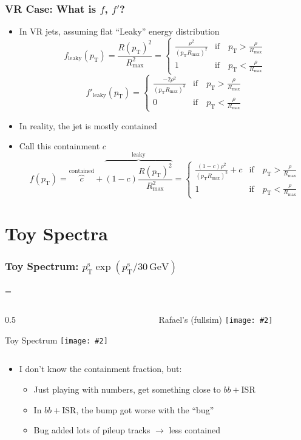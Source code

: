 \documentclass[xcolor={table}]{beamer}
\newcommand{\pt}{p_{\mathrm{T}}}
\newcommand{\ptr}{\pt}
\newcommand{\ptt}{\pt^{\text{s}}}
\newcommand{\graphic}[2][0.99]{\texttt{[image: \#2]}}
\newcommand{\twocol}[3][0.5]{
  \newdimen\scwid
  \scwid=\dimexpr\textwidth-#1\textwidth\relax
  \begin{columns}
    \begin{column}{#1\textwidth}#2\end{column}
      \begin{column}{\scwid}#3\end{column}
  \end{columns}
}
\begin{document}
\begin{frame}
  \frametitle{VR Case: What is $f$, $f'$?}
  \begin{itemize}
  \item In VR jets, assuming flat ``Leaky'' energy distribution
    \[ f_{\text{leaky}}(\ptr) = \frac{R(\ptr)^{2}}{R^{2}_{\text{max}}} = \begin{cases}
      \frac{ \rho^2 }{(\ptr R_{\text{max}})^2}  &\text{if}\quad \ptr > \frac{\rho}{R_{\text{max}}}\\
       1 &\text{if}\quad  \ptr <  \frac{\rho}{R_{\text{max}}}
    \end{cases}
      \]
    \[ f'_{\text{leaky}}(\ptr) = \begin{cases}
      \frac{-2 \rho^2 }{(\ptr R_{\text{max}})^3}  &\text{if}\quad \ptr > \frac{\rho}{R_{\text{max}}}\\
      0 &\text{if}\quad  \ptr <  \frac{\rho}{R_{\text{max}}}
    \end{cases}
    \]
  \item In reality, the jet is mostly contained
  \item Call this containment $c$
    \[ f(\ptr) = \overbrace{c}^{\text{contained}} + \overbrace{(1-c) \frac{R(\ptr)^{2}}{R^{2}_{\text{max}}}}^{\text{leaky}} = \begin{cases}
      \frac{ (1-c) \rho^2 }{(\ptr R_{\text{max}})^2} + c  &
      \text{if}\quad \ptr > \frac{\rho}{R_{\text{max}}} \\
      1 & \text{if}\quad  \ptr <  \frac{\rho}{R_{\text{max}}}
    \end{cases}
      \]
  \end{itemize}
\end{frame}

\section{Toy Spectra}

\begin{frame}
  \frametitle{Toy Spectrum: $\ptt \exp(\ptt / 30\, \text{GeV})$}
  \twocol{
    \begin{center}
      Toy Spectrum
      \graphic{{spec.pdf}}
    \end{center}
  }{
    \begin{center}
      Rafael's (fullsim)
      \graphic{trkjet1_pt.png}
    \end{center}
  }
  \begin{itemize}
  \item I don't know the containment fraction, but:
    \begin{itemize}
    \item Just playing with numbers, get something close to $bb + \text{ISR}$
    \item In $bb + \text{ISR}$, the bump got worse with the ``bug''
    \item Bug added lots of pileup tracks $\to$ less contained
    \end{itemize}
  \end{itemize}
\end{frame}
\end{document}
